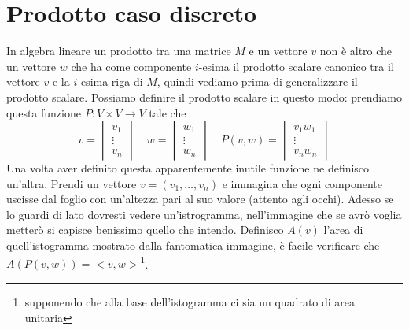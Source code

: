 \documentclass[11pt,a4paper]{article}
\theoremstyle{definition}
\theoremstyle{plain}
\theoremstyle{plain}
\begin{document}
	\section{Prodotto caso discreto}
		In algebra lineare un prodotto tra una matrice $M$ e un vettore $v$ non è altro che un vettore $w$ che ha come componente $i$-esima il prodotto scalare canonico tra il vettore $v$ e la $i$-esima riga di $M$, quindi vediamo prima di generalizzare il prodotto scalare.\newline
		Possiamo definire il prodotto scalare in questo modo: prendiamo questa funzione $P:V\times V\rightarrow V$ tale che 
		\begin{equation}
			v=
			\begin{vmatrix}
				v_1\\
				\vdots \\
				v_n
			\end{vmatrix}
			\quad w=
			\begin{vmatrix}
				w_1\\
				\vdots \\
				w_n
			\end{vmatrix}
			\quad P(v,w)=
			\begin{vmatrix}
				v_1 w_1\\
				\vdots \\
				v_n w_n
			\end{vmatrix}
		\end{equation}
		Una volta aver definito questa apparentemente inutile funzione ne definisco un'altra. Prendi un vettore $v=(v_1,\dots,v_n)$ e immagina che ogni componente uscisse dal foglio con un'altezza pari al suo valore (attento agli occhi).\newline
		Adesso se lo guardi di lato dovresti vedere un'istrogramma, nell'immagine che se avrò voglia metterò si capisce benissimo quello che intendo.\newline
		Definisco $A(v)$ l'area di quell'istogramma mostrato dalla fantomatica immagine, è facile verificare che $A(P(v,w))=<v,w>$\footnote{supponendo che alla base dell'istogramma ci sia un quadrato di area unitaria}.
\end{document}
